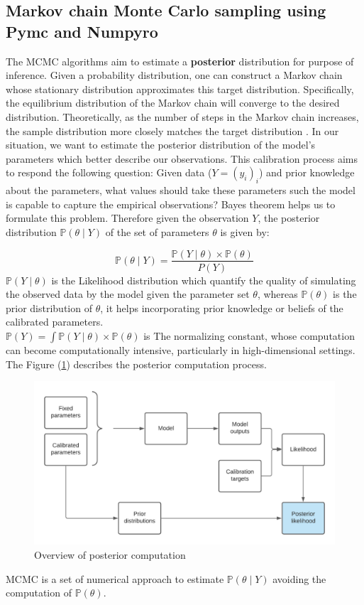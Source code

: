 \documentclass[nonatbib,preprint,12pt,authoryear]{elsarticle}
\begin{document}
\subsection{Markov chain Monte Carlo sampling using Pymc and Numpyro}
The MCMC algorithms aim to estimate a \textbf{posterior} distribution for purpose of inference.
Given a probability distribution, one can construct a Markov chain whose stationary distribution approximates this target distribution. Specifically, the equilibrium distribution of the Markov chain will converge to the desired distribution. Theoretically, as the number of steps in the Markov chain increases, the sample distribution more closely matches the target distribution \cite{padmanabhan_ranjan_2022_Markov_Chain}.
In our situation, we want to estimate the posterior distribution of the model's parameters which better describe our observations. This calibration process aims to respond the following question: Given data ($Y = (y_i)_i$) and prior knowledge about the parameters, what values should take these parameters such the model is capable to capture the empirical observations? 
Bayes theorem helps us to formulate this problem. Therefore given the observation $Y$, the posterior distribution $\mathbb{P}(\theta \mid Y) $ of the set of parameters $\theta$ is given by:

\begin{equation}
    \label{eq:poste_bayes_thrm}
    \mathbb{P}(\theta \mid Y) = \frac{\mathbb{P}(Y \mid \theta) \times \mathbb{P}(\theta)}{P(Y)}
\end{equation}
$\mathbb{P}(Y \mid \theta)$ is the Likelihood distribution which quantify the quality of simulating the observed data by the model given the parameter set $\theta$, whereas $\mathbb{P}(\theta)$ is the prior distribution of $\theta$, it helps incorporating prior knowledge or beliefs of the calibrated parameters.\\
$\mathbb{P}(Y) = \int \mathbb{P}(Y \mid \theta) \times \mathbb{P}(\theta)$ is The normalizing constant, whose computation can become computationally intensive, particularly in high-dimensional settings.
The Figure (\ref{fig:Posterior}) describes the posterior computation process.
\begin{figure}[H]
    \centering
    \includegraphics[width = 0.8\linewidth, height = 0.5\linewidth]{Figures/posterior_computation_overview.png}
    \caption{Overview of posterior computation}
    \label{fig:Posterior}
\end{figure}
 MCMC is a set of numerical approach to estimate $\mathbb{P}(\theta \mid Y)$ avoiding the computation of $\mathbb{P}(\theta)$.
\end{document}
